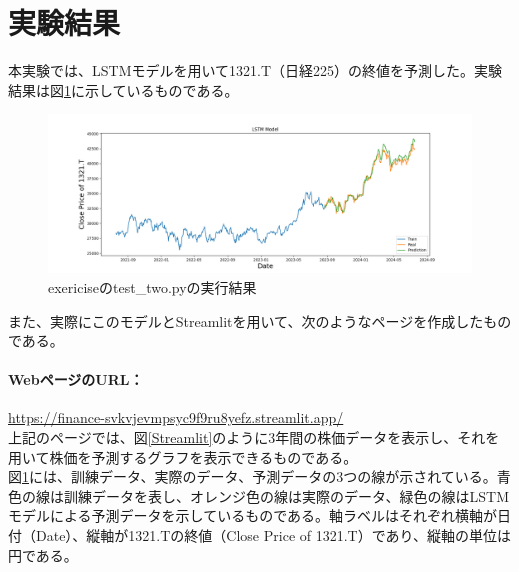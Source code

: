 \documentclass[a4paper, 11pt, titlepage]{jsarticle}
\begin{document}
\section{実験結果}
\indent 本実験では、LSTMモデルを用いて1321.T（日経225）の終値を予測した。実験結果は図\ref{twopython}に示しているものである。
\begin{figure}[htbp]
  \centering
  \includegraphics[width=120mm]{./exericise/image/lstm_model.png}
  \caption{exericiseのtest\_two.pyの実行結果}
  \label{twopython}
\end{figure}

\indent また、実際にこのモデルとStreamlitを用いて、次のようなページを作成したものである。\\
\paragraph{WebページのURL：}\url{https://finance-svkvjevmpsyc9f9ru8yefz.streamlit.app/} \\
\indent 上記のページでは、図\ref{Streamlit}のように3年間の株価データを表示し、それを用いて株価を予測するグラフを表示できるものである。 \\
\indent 図\ref{twopython}には、訓練データ、実際のデータ、予測データの3つの線が示されている。青色の線は訓練データを表し、オレンジ色の線は実際のデータ、緑色の線はLSTMモデルによる予測データを示しているものである。軸ラベルはそれぞれ横軸が日付（Date）、縦軸が1321.Tの終値（Close Price of 1321.T）であり、縦軸の単位は円である。
\end{document}
